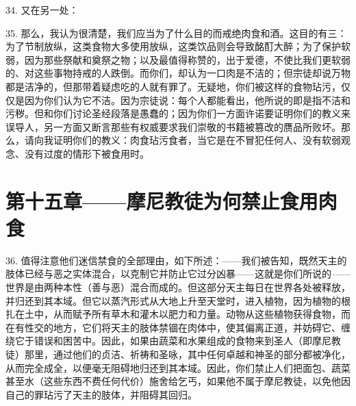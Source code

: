 34. 又在另一处：\par

35. 那么，我认为很清楚，我们应当为了什么目的而戒绝肉食和酒。这目的有三：为了节制放纵，这类食物大多使用放纵，这类饮品则会导致酩酊大醉；为了保护软弱，因为那些祭献和奠祭之物；以及最值得称赞的，出于爱德，不使比我们更软弱的、对这些事物持戒的人跌倒。而你们，却认为一口肉是不洁的；但宗徒却说万物都是洁净的，但那带着疑虑吃的人就有罪了。无疑地，你们被这样的食物玷污，仅仅是因为你们认为它不洁。因为宗徒说：每个人都能看出，他所说的即是指不洁和污秽。但和你们讨论圣经段落是愚蠢的；因为你们一方面许诺要证明你们的教义来误导人，另一方面又断言那些有权威要求我们崇敬的书籍被篡改的赝品所败坏。那么，请向我证明你们的教义：肉食玷污食者，当它是在不冒犯任何人、没有软弱观念、没有过度的情形下被食用时。\par


\section{第十五章——摩尼教徒为何禁止食用肉食}

36. 值得注意他们迷信禁食的全部理由，如下所述：——我们被告知，既然天主的肢体已经与恶之实体混合，以克制它并防止它过分凶暴——这就是你们所说的——世界是由两种本性（善与恶）混合而成的。但这部分天主每日在世界各处被释放，并归还到其本域。但它以蒸汽形式从大地上升至天堂时，进入植物，因为植物的根扎在土中，从而赋予所有草木和灌木以肥力和力量。动物从这些植物获得食物，而在有性交的地方，它们将天主的肢体禁锢在肉体中，使其偏离正道，并妨碍它、缠绕它于错误和困苦中。因此，如果由蔬菜和水果组成的食物来到圣人（即摩尼教徒）那里，通过他们的贞洁、祈祷和圣咏，其中任何卓越和神圣的部分都被净化，从而完全成全，以便毫无阻碍地归还到其本域。因此，你们禁止人们把面包、蔬菜甚至水（这些东西不费任何代价）施舍给乞丐，如果他不属于摩尼教徒，以免他因自己的罪玷污了天主的肢体，并阻碍其回归。\par

